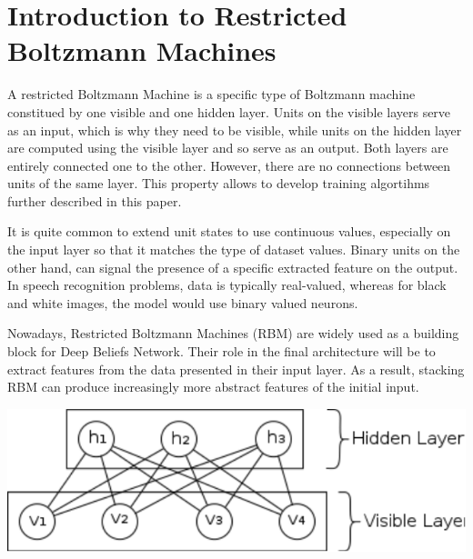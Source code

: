 \documentclass{report}
\begin{document}
	
	\section{Introduction to Restricted Boltzmann Machines}
	
	A restricted Boltzmann Machine is a specific type of Boltzmann machine 
	constitued by one visible and one hidden layer. Units on the visible layers serve as 
	an input, which is why they need to be visible, while units on the hidden layer are computed using the visible layer and so serve as an output. 
	Both layers are entirely connected one to the other. However, there are no 
	connections between units of the same layer. This property allows to 
	develop training algortihms further described in this paper.
	
	It is quite common to extend unit states to use continuous values, especially 
	on the input layer so that it matches the type of dataset values. Binary units 
	on the other hand, can signal the presence of a specific extracted feature on 
	the output. In speech recognition problems, data is typically real-valued, 
	whereas for black and white images, the model would use binary valued neurons.
	
	Nowadays, Restricted Boltzmann Machines (RBM) are widely used as a 
	building block for Deep Beliefs Network. Their role in the final architecture 
	will be to extract features from the data presented in their input layer. 
	As a result, stacking RBM can produce increasingly more abstract features of
	the initial input. 
	
	\vspace{0.5cm}
	\begin{center}
		\includegraphics[scale=0.7]{ressources/rbm}
	\end{center}
	\vspace{0.5cm}
	
\end{document}
